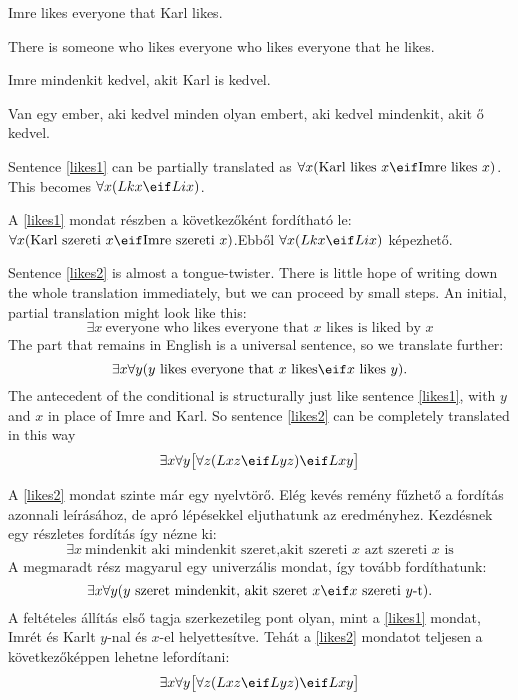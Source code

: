 \begin{earg}
\item[\ex{likes1}]Imre likes everyone that Karl likes.
\item[\ex{likes2}]There is someone who likes everyone who likes everyone that he likes.
\end{earg}

\begin{earg}
\item[\ex{likes1}]Imre mindenkit kedvel, akit Karl is kedvel.
\item[\ex{likes2}]Van egy ember, aki kedvel minden olyan embert, aki kedvel mindenkit, akit ő kedvel.
\end{earg}



Sentence \ref{likes1} can be partially translated as $\forall x(\mbox{Karl likes $x$}\eif\mbox{Imre likes $x$})$. This becomes $\forall x(Lkx\eif Lix)$.

A \ref{likes1} mondat részben a következőként fordítható le: $\forall x(\mbox{Karl szereti $x$}\eif\mbox{Imre szereti $x$})$.Ebből $\forall x(Lkx\eif Lix)$ képezhető.


Sentence \ref{likes2} is almost a tongue-twister. There is little hope of writing down the whole translation immediately, but we can proceed by small steps. An initial, partial translation might look like this: $$\exists x\ \mbox{everyone who likes everyone that $x$ likes is liked by $x$}$$
The part that remains in English is a universal sentence, so we translate further: $$\exists x\forall y(\mbox{$y$ likes everyone that $x$ likes}\eif\mbox{$x$ likes $y$}).$$
The antecedent of the conditional is structurally just like sentence \ref{likes1}, with $y$ and $x$ in place of Imre and Karl. So sentence \ref{likes2} can be completely translated in this way $$\exists x\forall y\bigl[\forall z(Lxz \eif Lyz) \eif Lxy\bigr]$$

A \ref{likes2} mondat szinte már egy nyelvtörő. Elég kevés remény fűzhető a fordítás azonnali leírásához, de apró lépésekkel eljuthatunk az eredményhez. Kezdésnek egy részletes fordítás így nézne ki: $$\exists x\ \mbox{mindenkit aki mindenkit szeret,akit szereti $x$ azt szereti $x$ is}$$
A megmaradt rész magyarul egy univerzális mondat, így tovább fordíthatunk: $$\exists x\forall y(\mbox{$y$ szeret mindenkit, akit szeret $x$}\eif\mbox{$x$ szereti $y$-t}).$$
A feltételes állítás első tagja szerkezetileg pont olyan, mint a \ref{likes1} mondat, Imrét és Karlt $y$-nal és $x$-el helyettesítve. Tehát a \ref{likes2} mondatot teljesen a következőképpen lehetne lefordítani: $$\exists x\forall y\bigl[\forall z(Lxz \eif Lyz) \eif Lxy\bigr]$$


